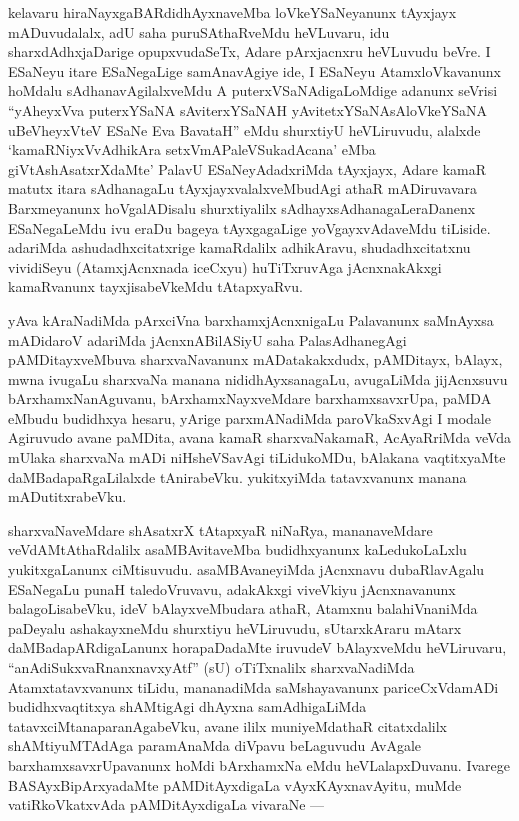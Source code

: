 
\begin{artha}
kelavaru hiraNayxgaBARdidhAyxnaveMba loVkeYSaNeyanunx tAyxjayx mADuvudalalx, adU saha puruSAthaRveMdu heVLuvaru, idu sharxdAdhxjaDarige opupxvudaSeTx, Adare pArxjacnxru heVLuvudu beVre. I ESaNeyu itare ESaNegaLige samAnavAgiye ide, I ESaNeyu AtamxloVkavanunx hoMdalu sAdhanavAgilalxveMdu A puterxVSaNAdigaLoMdige adanunx seVrisi ``yAheyxVva puterxYSaNA sAviterxYSaNAH yAvitetxYSaNAsAloVkeYSaNA uBeVheyxVteV ESaNe Eva BavataH'' eMdu shurxtiyU heVLiruvudu, alalxde `kamaRNiyxVvAdhikAra setxVmAPaleVSukadAcana' eMba giVtAshAsatxrXdaMte' PalavU ESaNeyAdadxriMda tAyxjayx, Adare kamaR matutx itara sAdhanagaLu tAyxjayxvalalxveMbudAgi athaR mADiruvavara Barxmeyanunx hoVgalADisalu shurxtiyalilx sAdhayxsAdhanagaLeraDanenx ESaNegaLeMdu ivu eraDu bageya tAyxgagaLige yoVgayxvAdaveMdu tiLiside. adariMda ashudadhxcitatxrige kamaRdalilx adhikAravu, shudadhxcitatxnu vividiSeyu (AtamxjAcnxnada iceCxyu) huTiTxruvAga jAcnxnakAkxgi kamaRvanunx tayxjisabeVkeMdu tAtapxyaRvu.
\end{artha}


\begin{artha}
yAva kAraNadiMda pArxciVna barxhamxjAcnxnigaLu Palavanunx saMnAyxsa mADidaroV adariMda jAcnxnABilASiyU saha PalasAdhanegAgi pAMDitayxveMbuva sharxvaNavanunx mADatakakxdudx, pAMDitayx, bAlayx, mwna ivugaLu sharxvaNa manana nididhAyxsanagaLu, avugaLiMda jijAcnxsuvu bArxhamxNanAguvanu, bArxhamxNayxveMdare barxhamxsavxrUpa, paMDA eMbudu budidhxya hesaru, yArige parxmANadiMda paroVkaSxvAgi I modale Agiruvudo avane paMDita, avana kamaR sharxvaNakamaR, AcAyaRriMda veVda mUlaka sharxvaNa mADi niHsheVSavAgi tiLidukoMDu, bAlakana vaqtitxyaMte daMBadapaRgaLilalxde tAnirabeVku. yukitxyiMda tatavxvanunx manana mADutitxrabeVku.
\end{artha}


\begin{artha}
sharxvaNaveMdare shAsatxrX tAtapxyaR niNaRya, mananaveMdare veVdAMtAthaRdalilx asaMBAvitaveMba budidhxyanunx kaLedukoLaLxlu yukitxgaLanunx ciMtisuvudu. a\-saMBAvaneyiMda jAcnxnavu dubaRlavAgalu ESaNegaLu punaH taledoVruvavu, adakAkxgi viveVkiyu jAcnxnavanunx balagoLisabeVku, ideV bAlayxveMbudara athaR, Atamxnu balahiVnaniMda paDeyalu ashakayxneMdu shurxtiyu heVLiruvudu, sUtarxkAraru mAtarx daMBadapARdigaLanunx horapaDadaMte iruvudeV bAlayxveMdu heVLiruvaru, ``anAdiSukxvaRnanxnavxyAtf'' (sU) oTiTxnalilx sharxvaNadiMda Atamxtatavxvanunx tiLidu, \-mananadiMda saMshayavanunx pariceCxVdamADi budidhxvaqtitxya shAMtigAgi dhAyxna samAdhi\-gaLiMda tatavxciMtanaparanAgabeVku, avane ililx muniyeMdathaR citatxdalilx shAMti\-yuMTAdAga paramAnaMda diVpavu beLaguvudu AvAgale barxhamxsavxrUpavanunx \-hoMdi bArxhamxNa eMdu heVLalapxDuvanu. Ivarege BASAyxBipArxyadaMte pAMDitAyx\-digaLa vAyxKAyxnavAyitu, muMde vatiRkoVkatxvAda pAMDitAyxdigaLa vivaraNe --- 
\end{artha}


